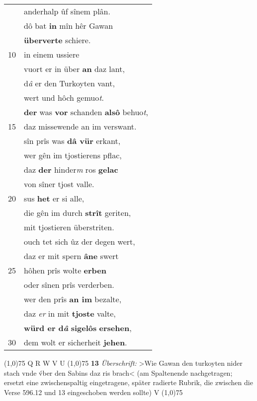 \documentclass[8pt,a4paper,notitlepage]{article}
\begin{document}
\begin{table}[ht]
\begin{minipage}[t]{0.5\linewidth}
\begin{tabular}{rl}
 & anderhalp ûf sînem plân.\\ 
 & dô bat \textbf{in} mîn hêr Gawan\\ 
 & \textbf{überverte} schiere.\\ 
10 & in einem ussiere\\ 
 & vuort er in über \textbf{an} daz lant,\\ 
 & d\textit{â} er den Turkoyten vant,\\ 
 & wert und hôch gemuo\textit{t}.\\ 
 & \textbf{der} was \textbf{vor} schanden \textbf{alsô} behuo\textit{t},\\ 
15 & daz missewende an im verswant.\\ 
 & sîn prîs was \textbf{dâ vür} erkant,\\ 
 & wer gên im tjostierens pflac,\\ 
 & daz \textbf{der} hinder\textit{m} ros \textbf{gelac}\\ 
 & von sîner tjost valle.\\ 
20 & sus \textbf{het} er si alle,\\ 
 & die gên im durch \textbf{strît} geriten,\\ 
 & mit tjostieren überstriten.\\ 
 & ouch tet sich ûz der degen wert,\\ 
 & daz er mit spern \textbf{âne} swert\\ 
25 & hôhen prîs wolte \textbf{erben}\\ 
 & oder sînen prîs verderben.\\ 
 & wer den prîs \textbf{an im} bezalte,\\ 
 & daz \textit{er} in mit \textbf{tjoste} valte,\\ 
 & \textbf{würd er d\textit{â}} \textbf{sigelôs} \textbf{ersehen},\\ 
30 & dem wolt er sicherheit \textbf{jehen}.\\ 
\end{tabular}
\scriptsize
\line(1,0){75} \newline
Q R W V U \newline
\line(1,0){75} \newline
\textbf{13} \textit{Überschrift:} >Wie Gawan den turkoyten nider stach vnde v́ber den Sabins daz ris brach< (am Spaltenende nachgetragen; ersetzt eine zwischenspaltig eingetragene, später radierte Rubrik, die zwischen die Verse 596.12 und 13 eingeschoben werden sollte) V  \newline
\line(1,0){75} \newline

\end{minipage}
\end{table}
\end{document}
